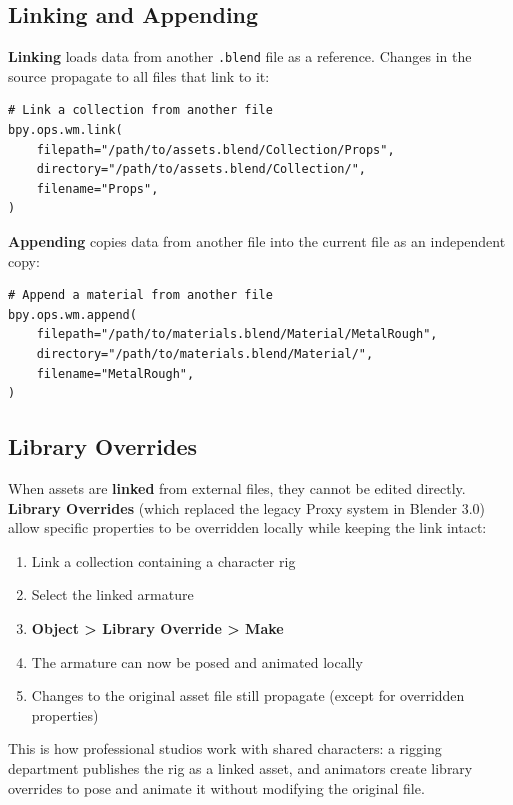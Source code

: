 \subsection{Linking and Appending}

\textbf{Linking} loads data from another \texttt{.blend} file as a reference. Changes in the source propagate to all files that link to it:

\begin{lstlisting}
# Link a collection from another file
bpy.ops.wm.link(
    filepath="/path/to/assets.blend/Collection/Props",
    directory="/path/to/assets.blend/Collection/",
    filename="Props",
)
\end{lstlisting}

\textbf{Appending} copies data from another file into the current file as an independent copy:

\begin{lstlisting}
# Append a material from another file
bpy.ops.wm.append(
    filepath="/path/to/materials.blend/Material/MetalRough",
    directory="/path/to/materials.blend/Material/",
    filename="MetalRough",
)
\end{lstlisting}

\subsection{Library Overrides}

When assets are \textbf{linked} from external files, they cannot be edited directly. \textbf{Library Overrides} (which replaced the legacy Proxy system in Blender 3.0) allow specific properties to be overridden locally while keeping the link intact:

\begin{enumerate}[leftmargin=2em]
  \item Link a collection containing a character rig
  \item Select the linked armature
  \item \textbf{Object > Library Override > Make}
  \item The armature can now be posed and animated locally
  \item Changes to the original asset file still propagate (except for overridden properties)
\end{enumerate}

This is how professional studios work with shared characters: a rigging department publishes the rig as a linked asset, and animators create library overrides to pose and animate it without modifying the original file.

